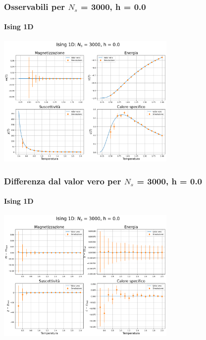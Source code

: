 \begin{frame}
    \frametitle{Osservabili per $N_s$ = 3000, h = 0.0}
    \framesubtitle{Ising 1D}

    \centering
    \includegraphics[width=0.65\textwidth]{Immagini/backupIsing1D/obs_3000_0.0.png}

\end{frame}



\begin{frame}
    \frametitle{Differenza dal valor vero per $N_s$ = 3000, h = 0.0}
    \framesubtitle{Ising 1D}

    \centering
    \includegraphics[width=0.65\textwidth]{Immagini/backupIsing1D/obs_3000_0.0_diff.png}

\end{frame}



